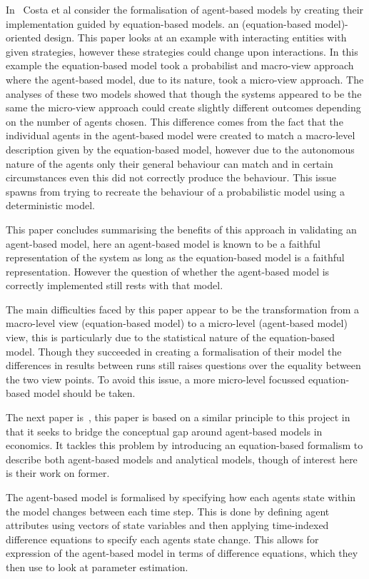 \documentclass{article}
\begin{document}
In~\cite{ebmabmi} Costa et al consider the formalisation of agent-based models by creating their implementation guided by equation-based models. an (equation-based model)-oriented design. This paper looks at an example with interacting entities with given strategies, however these strategies could change upon interactions. In this example the equation-based model took a probabilist and macro-view approach where the agent-based model, due to its nature, took a micro-view approach. The analyses of these two models showed that though the systems appeared to be the same the micro-view approach could create slightly different outcomes depending on the number of agents chosen. This difference comes from the fact that the individual agents in the agent-based model were created to match a macro-level description given by the equation-based model, however due to the autonomous nature of the agents only their general behaviour can match and in certain circumstances even this did not correctly produce the behaviour. This issue spawns from trying  to recreate the behaviour of a probabilistic model using a deterministic model. 

This paper concludes summarising the benefits of this approach in validating an agent-based model, here an agent-based model is known to be a faithful representation of the system as long as the equation-based model is a faithful representation. However the question of whether the agent-based model is correctly implemented still rests with that model. 

The main difficulties faced by this paper appear to be the transformation from a macro-level view (equation-based model) to a micro-level (agent-based model) view, this is particularly due to the statistical nature of the equation-based model. Though they succeeded in creating a formalisation of their model the differences in results between runs still raises questions over the equality between the two view points. To avoid this issue, a more micro-level focussed equation-based model should be taken.

The next paper is~\cite{econmistsnoabm}, this paper is based on a similar principle to this project in that it seeks to bridge the conceptual gap around  agent-based models in economics. It tackles this problem by introducing an equation-based formalism to describe both agent-based models and analytical models, though of interest here is their work on former. 

The agent-based model is formalised by specifying how each agent\textsc{}s state within the model changes between each time step. This is done by defining agent attributes using vectors of state variables and then applying time-indexed difference equations to specify each agents state change. This allows for expression of the agent-based model in terms of difference equations, which they then use to look at parameter estimation. 
\end{document}
